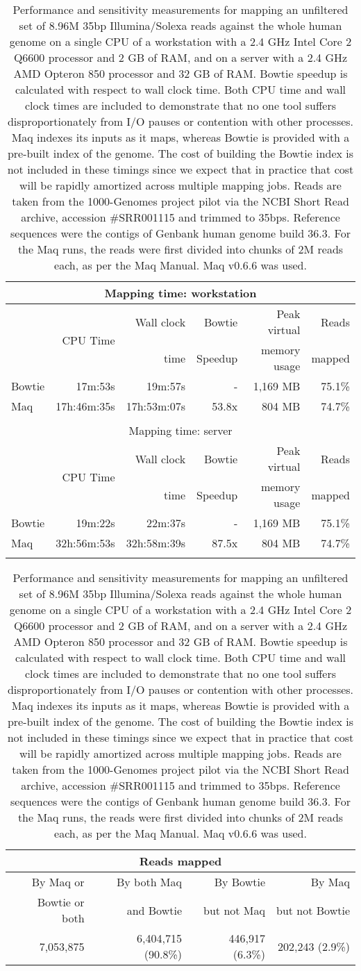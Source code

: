 \documentclass[letterpaper]{article}
\begin{document}
\begin{table}[tp]
\scriptsize
\begin{tabular*}{1.00\textwidth}{@{\extracolsep{\fill}} lrrrrr}
\multicolumn{6}{c}{\small{Mapping time: workstation}} \\[3pt]
\toprule
 & \multirow{2}{*}{CPU Time} & Wall clock & Bowtie  & Peak virtual & Reads  \\
 &                            & time       & Speedup & memory usage & mapped \\[3pt]
\toprule
Bowtie & 17m:53s & 19m:57s & - & 1,169 MB & 75.1\%\\\midrule
Maq & 17h:46m:35s & 17h:53m:07s & 53.8x & 804 MB & 74.7\%\\
\toprule\\[1pt]
\multicolumn{6}{c}{\small{Mapping time: server}} \\[3pt]
\toprule
 & \multirow{2}{*}{CPU Time} & Wall clock & Bowtie  & Peak virtual & Reads  \\
 &                            & time       & Speedup & memory usage & mapped \\[3pt]
\toprule
Bowtie & 19m:22s & 22m:37s & - & 1,169 MB & 75.1\%\\\midrule
Maq & 32h:56m:53s & 32h:58m:39s & 87.5x & 804 MB & 74.7\%\\
\bottomrule\\[1pt]
\end{tabular*}
\begin{tabular*}{1.00\textwidth}{@{\extracolsep{\fill}} rrrr}
\multicolumn{4}{c}{\small{Reads mapped}} \\[3pt]
\toprule 
By Maq or      & By both Maq & By Bowtie   & By Maq         \\ 
Bowtie or both & and Bowtie  & but not Maq & but not Bowtie \\ 
\toprule
7,053,875 & 6,404,715 (90.8\%) & 446,917 (6.3\%) & 202,243 (2.9\%) \\ 
\bottomrule
\end{tabular*}
\caption{Performance and sensitivity measurements for mapping an unfiltered
set of 8.96M 35bp Illumina/Solexa reads
against the whole human genome on a single CPU of a workstation with a 2.4 GHz
Intel Core 2 Q6600 processor and 2 GB of RAM, and on a server with a 2.4 GHz
AMD Opteron 850 processor and 32 GB of RAM. Bowtie speedup is calculated with
respect to wall clock time. Both CPU time and wall clock times are included to
demonstrate that no one tool suffers disproportionately from I/O pauses or
contention with other processes. Maq indexes its inputs as it maps,
whereas Bowtie is provided with a pre-built index of the
genome.  The cost of building the Bowtie index is not included in these timings
since we expect that in practice that cost will be rapidly amortized across
multiple mapping jobs. Reads are taken from the 1000-Genomes project pilot via
the NCBI Short Read archive, accession \#SRR001115 and trimmed to 35bps.
Reference sequences were the contigs of Genbank human genome build 36.3. For
the Maq runs, the reads were first
divided into chunks of 2M reads each, as per the Maq Manual. Maq
v0.6.6 was used. }
\end{table}
\end{document}
